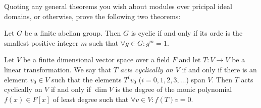 Quoting any general theorems you wish about modules over pricipal
ideal domains, or otherwise, prove the following two theorems:
\begin{alist}
\item Let $G$ be a finite abelian group. Then $G$ is cyclic if and
only if its orde is the smallest positive integer $m$ such that
$\forall g\in G:g^m=1$.
\item Let $V$ be a finite dimensional vector space over a field $F$
and let $T:V\rightarrow V$ be a linear transformation. We say that
\emph{ $T$ acts cyclically on $V$} if and only if there is an element 
$v_0\in V$ such that the elements $T^iv_0$ ($i=0,1,2,3,\ldots $) span
$V$. Then $T$ acts cyclically on $V$ if and only if $\dim V$ is the
degree of the monic polynomial $f(x)\in F[x]$ of least degree such
that $\forall v\in V:f(T)v=0$.
\end{alist}
